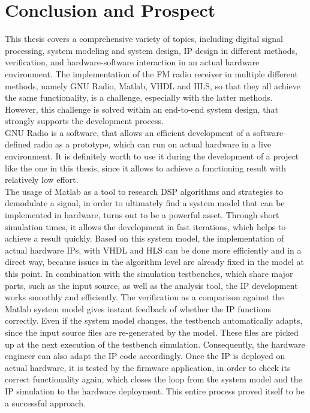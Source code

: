 \chapter{Conclusion and Prospect}
\label{cha:ConclusionAndProspect}

This thesis covers a comprehensive variety of topics, including digital signal processing, system modeling and system design, IP design in different methods, verification, and hardware-software interaction in an actual hardware environment.
The implementation of the FM radio receiver in multiple different methods, namely GNU Radio, Matlab, VHDL and HLS, so that they all achieve the same functionality, is a challenge, especially with the latter methods.
However, this challenge is solved within an end-to-end system design, that strongly supports the development process.\\

GNU Radio is a software, that allows an efficient development of a software-defined radio as a prototype, which can run on actual hardware in a live environment.
It is definitely worth to use it during the development of a project like the one in this thesis, since it allows to achieve a functioning result with relatively low effort.\\

The usage of Matlab as a tool to research DSP algorithms and strategies to demodulate a signal, in order to ultimately find a system model that can be implemented in hardware, turns out to be a powerful asset.
Through short simulation times, it allows the development in fast iterations, which helps to achieve a result quickly.
Based on this system model, the implementation of actual hardware IPs, with VHDL and HLS can be done more efficiently and in a direct way, because issues in the algorithm level are already fixed in the model at this point.
In combination with the simulation testbenches, which share major parts, such as the input source, as well as the analysis tool, the IP development works smoothly and efficiently.
The verification as a comparison against the Matlab system model gives instant feedback of whether the IP functions correctly.
Even if the system model changes, the testbench automatically adapts, since the input source files are re-generated by the model.
These files are picked up at the next execution of the testbench simulation.
Consequently, the hardware engineer can also adapt the IP code accordingly.
Once the IP is deployed on actual hardware, it is tested by the firmware application, in order to check its correct functionality again, which closes the loop from the system model and the IP simulation to the hardware deployment.
This entire process proved itself to be a successful approach.\\

